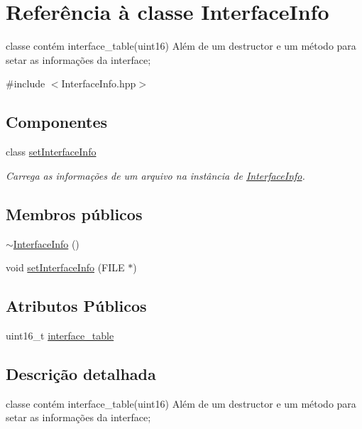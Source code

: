 \hypertarget{class_interface_info}{}\section{Referência à classe Interface\+Info}
\label{class_interface_info}


classe contém interface\+\_\+table(uint16) Além de um destructor e um método para setar as informações da interface;  




{\ttfamily \#include $<$Interface\+Info.\+hpp$>$}

\subsection*{Componentes}
\begin{DoxyCompactItemize}
\item 
class \hyperlink{class_interface_info_1_1set_interface_info}{set\+Interface\+Info}
\begin{DoxyCompactList}\small\item\em Carrega as informações de um arquivo na instância de \hyperlink{class_interface_info}{Interface\+Info}. \end{DoxyCompactList}\end{DoxyCompactItemize}
\subsection*{Membros públicos}
\begin{DoxyCompactItemize}
\item 
\hyperlink{class_interface_info_a8076e3917229d36ac006576adb5fd404}{$\sim$\+Interface\+Info} ()
\item 
void \hyperlink{class_interface_info_a9fa9166bbfee8837d611da9a88d1ba67}{set\+Interface\+Info} (F\+I\+LE $\ast$)
\end{DoxyCompactItemize}
\subsection*{Atributos Públicos}
\begin{DoxyCompactItemize}
\item 
uint16\+\_\+t \hyperlink{class_interface_info_a5f6c0c20f598a2e8d000a9513776099c}{interface\+\_\+table}
\end{DoxyCompactItemize}


\subsection{Descrição detalhada}
classe contém interface\+\_\+table(uint16) Além de um destructor e um método para setar as informações da interface; 


